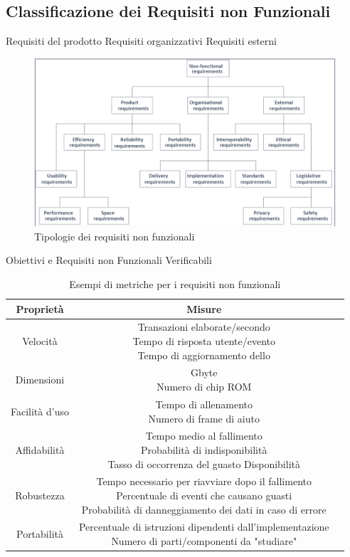 \documentclass{article}
\begin{document}
	\subsection{Classificazione dei Requisiti non Funzionali}
	Requisiti del prodotto
	Requisiti organizzativi
	Requisiti esterni
	\begin{figure}[h]
		\centering
		\includegraphics[scale=0.3]{11.tipi_ric_non_func.png}
		\caption{Tipologie dei requisiti non funzionali}
	\end{figure}
	Obiettivi e Requisiti non Funzionali Verificabili
	\begin{table}[h!]
		\centering
		\begin{tabular}{ |c|c|c| } 
			\hline
			\textbf{Proprietà} & \textbf{Misure}\\
			\hline
			Velocità & \makecell{Transazioni elaborate/secondo \\ Tempo di risposta utente/evento \\ Tempo di aggiornamento dello}\\
			\hline
			Dimensioni & \makecell{Gbyte \\ Numero di chip ROM}\\
			\hline
			Facilità d'uso & \makecell{Tempo di allenamento \\ Numero di frame di aiuto}\\
			\hline
			Affidabilità & \makecell{Tempo medio al fallimento \\ Probabilità di indisponibilità \\ Tasso di occorrenza del guasto Disponibilità}\\
			\hline
			Robustezza & \makecell{Tempo necessario per riavviare dopo il fallimento \\ Percentuale di eventi che causano guasti \\ Probabilità di danneggiamento dei dati in caso di errore}\\
			\hline
			Portabilità & \makecell{Percentuale di istruzioni dipendenti dall'implementazione \\ Numero di parti/componenti da "studiare"}\\
			\hline
		\end{tabular}
		\caption{Esempi di metriche per i requisiti non funzionali}
	\end{table}
\end{document}
